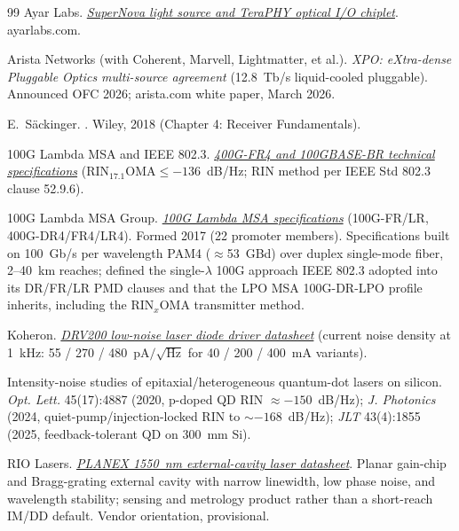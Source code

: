 \begin{thebibliography}{99}
Ayar Labs.
\newblock \emph{\href{https://ayarlabs.com/supernova/}{SuperNova light source and TeraPHY optical I/O chiplet}}.
\newblock ayarlabs.com.

Arista Networks (with Coherent, Marvell, Lightmatter, et al.).
\newblock \emph{XPO: eXtra-dense Pluggable Optics multi-source agreement}
(12.8~Tb/s liquid-cooled pluggable).
\newblock Announced OFC 2026; arista.com white paper, March 2026.

E.~Säckinger.
\newblock {}.
\newblock Wiley, 2018 (Chapter 4: Receiver Fundamentals).

100G Lambda MSA and IEEE 802.3.
\newblock \href{https://www.ieee802.org/3/bs/public/}{\emph{400G-FR4 and 100GBASE-BR technical specifications}} ($\mathrm{RIN}_{17.1}\mathrm{OMA}\le-136$~dB/Hz; RIN method per IEEE Std 802.3 clause 52.9.6).

100G Lambda MSA Group.
\newblock \emph{\href{https://100glambda.com/}{100G Lambda MSA specifications}} (100G-FR/LR, 400G-DR4/FR4/LR4).
\newblock Formed 2017 (22 promoter members). Specifications built on 100~Gb/s per
wavelength PAM4 ($\approx$53~GBd) over duplex single-mode fiber, 2--40~km reaches;
defined the single-$\lambda$ 100G approach IEEE 802.3 adopted into its DR/FR/LR PMD
clauses and that the LPO MSA 100G-DR-LPO profile inherits, including the
$\mathrm{RIN}_x\mathrm{OMA}$ transmitter method.

Koheron.
\newblock \href{https://www.koheron.com/}{\emph{DRV200 low-noise laser diode driver datasheet}}
(current noise density at 1~kHz: 55 / 270 / 480~pA$/\sqrt{\mathrm{Hz}}$ for 40 / 200 / 400~mA variants).

Intensity-noise studies of epitaxial/heterogeneous quantum-dot lasers on silicon.
\newblock \emph{Opt. Lett.} 45(17):4887 (2020, p-doped QD RIN $\approx-150$~dB/Hz);
\emph{J. Photonics} (2024, quiet-pump/injection-locked RIN to $\sim-168$~dB/Hz);
\emph{JLT} 43(4):1855 (2025, feedback-tolerant QD on 300~mm Si).

RIO Lasers.
\newblock \href{https://www.lasercomponents.com/fileadmin/user_upload/home/Datasheets/rio-laser/orion-planex-external-cavity-laser.pdf}{\emph{PLANEX 1550~nm external-cavity laser datasheet}}.
\newblock Planar gain-chip and Bragg-grating external cavity with narrow linewidth,
low phase noise, and wavelength stability; sensing and metrology product rather
than a short-reach IM/DD default. Vendor orientation, provisional.


\end{thebibliography}
